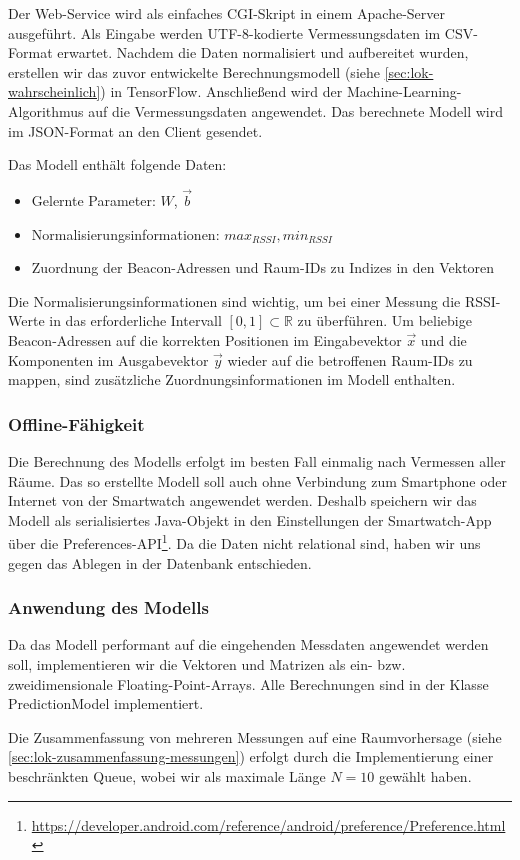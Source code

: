 Der Web-Service wird als einfaches CGI-Skript in einem Apache-Server ausgeführt.
Als Eingabe werden UTF-8-kodierte Vermessungsdaten im CSV-Format erwartet.
Nachdem die Daten normalisiert und aufbereitet wurden, erstellen wir das
zuvor entwickelte Berechnungsmodell (siehe \ref{sec:lok-wahrscheinlich}) in
TensorFlow. Anschließend wird der Machine-Learning-Algorithmus auf die
Vermessungsdaten angewendet.
Das berechnete Modell wird im JSON-Format an den Client gesendet.

Das Modell enthält folgende Daten:
\begin{itemize}
	\item Gelernte Parameter: $W$, $\vec{b}$
	\item Normalisierungsinformationen: $max_{RSSI}, min_{RSSI}$
	\item Zuordnung der Beacon-Adressen und Raum-IDs zu Indizes in den Vektoren
\end{itemize}
Die Normalisierungsinformationen sind wichtig, um bei einer Messung die RSSI-Werte in
das erforderliche Intervall $[0, 1] \subset \mathbb{R}$ zu überführen.
Um beliebige Beacon-Adressen auf die korrekten Positionen im Eingabevektor $\vec{x}$
und die Komponenten im Ausgabevektor $\vec{y}$ wieder auf die betroffenen Raum-IDs
zu mappen, sind zusätzliche Zuordnungsinformationen im Modell enthalten.

\subsubsection{Offline-Fähigkeit}

Die Berechnung des Modells erfolgt im besten Fall einmalig nach Vermessen aller Räume.
Das so erstellte Modell soll auch ohne Verbindung zum Smartphone oder Internet von
der Smartwatch angewendet werden. Deshalb speichern wir das Modell als serialisiertes
Java-Objekt in den Einstellungen der Smartwatch-App über die
Preferences-API\footnote{\url{https://developer.android.com/reference/android/preference/Preference.html}}.
Da die Daten nicht relational sind, haben wir uns gegen das Ablegen in der Datenbank
entschieden.

\subsubsection{Anwendung des Modells}

Da das Modell performant auf die eingehenden Messdaten angewendet werden soll,
implementieren wir die Vektoren und Matrizen als ein- bzw. zweidimensionale
Floating-Point-Arrays. Alle Berechnungen sind in der Klasse PredictionModel
implementiert.

Die Zusammenfassung von mehreren Messungen auf eine Raumvorhersage
(siehe \ref{sec:lok-zusammenfassung-messungen}) erfolgt durch die Implementierung
einer beschränkten Queue, wobei wir als maximale Länge $N = 10$ gewählt haben.

